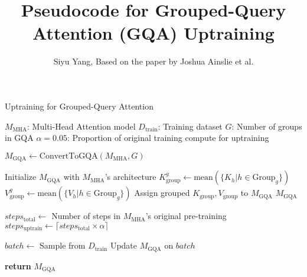 \documentclass{article}
\title{Pseudocode for Grouped-Query Attention (GQA) Uptraining}
\author{Siyu Yang, Based on the paper by Joshua Ainslie et al.}
\date{}
\begin{document}
\maketitle

\begin{algorithm}
\caption{Uptraining for Grouped-Query Attention}
\begin{algorithmic}[1]
\Require $M_{\text{MHA}}$: Multi-Head Attention model
\Require $D_{\text{train}}$: Training dataset
\Require $G$: Number of groups in GQA
\Require $\alpha = 0.05$: Proportion of original training compute for uptraining

\State $M_{\text{GQA}} \gets \text{ConvertToGQA}(M_{\text{MHA}}, G)$

    \State Initialize $M_{\text{GQA}}$ with $M_{\text{MHA}}$'s architecture
            \State $K_{\text{group}}^g \gets \text{mean}(\{K_{h} | h \in \text{Group}_g\})$
            \State $V_{\text{group}}^g \gets \text{mean}(\{V_{h} | h \in \text{Group}_g\})$
        \EndFor
        \State Assign grouped $K_{\text{group}}, V_{\text{group}}$ to $M_{\text{GQA}}$
    \EndFor
    \State \Return $M_{\text{GQA}}$
\EndFunction

\State $steps_{\text{total}} \gets$ Number of steps in $M_{\text{MHA}}$'s original pre-training
\State $steps_{\text{uptrain}} \gets \lceil steps_{\text{total}} \times \alpha \rceil$

    \State $batch \gets$ Sample from $D_{\text{train}}$
    \State Update $M_{\text{GQA}}$ on $batch$ 
\EndFor

\State \textbf{return} $M_{\text{GQA}}$
\end{algorithmic}
\end{algorithm}
\end{document}
